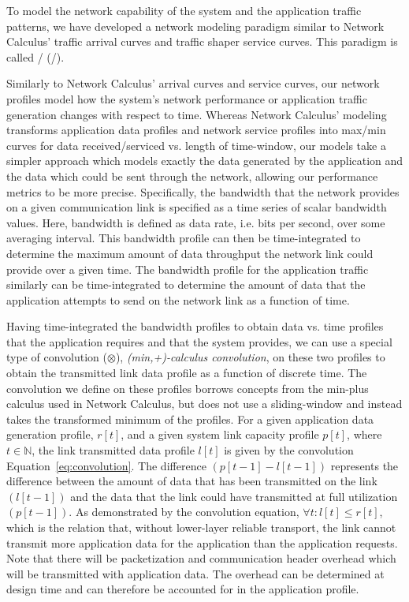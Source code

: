 To model the network capability of the system and the application
traffic patterns, we have developed a network modeling paradigm
similar to Network Calculus' traffic arrival curves and traffic shaper
service curves.  This paradigm is called \fulltool/ (\shorttool/). 

Similarly to Network Calculus' arrival curves and service curves, our
network profiles model how the system's network performance or
application traffic generation changes with respect to time.  Whereas
Network Calculus' modeling transforms application data profiles and
network service profiles into max/min curves for data
received/serviced vs. length of time-window, our models take a simpler
approach which models exactly the data generated by the application
and the data which could be sent through the network, allowing our
performance metrics to be more precise.  Specifically, the bandwidth
that the network provides on a given communication link is specified
as a time series of scalar bandwidth values. Here, bandwidth is
defined as data rate, i.e. bits per second, over some averaging
interval.  This bandwidth profile can then be time-integrated to
determine the maximum amount of data throughput the network link could
provide over a given time.  The bandwidth profile for the application
traffic similarly can be time-integrated to determine the amount of
data that the application attempts to send on the network link as a
function of time.

Having time-integrated the bandwidth profiles to obtain data vs. time
profiles that the application requires and that the system provides,
we can use a special type of convolution ($\otimes$),
\emph{(min,+)-calculus convolution}, on these two profiles to obtain
the transmitted link data profile as a function of discrete time. The
convolution we define on these profiles borrows concepts from the
min-plus calculus used in Network Calculus, but does not use a
sliding-window and instead takes the transformed minimum of the
profiles. For a given application data generation profile, $r[t]$, and
a given system link capacity profile $p[t]$, where $t\in\mathbb{N}$,
the link transmitted data profile $l[t]$ is given by the convolution
Equation~\ref{eq:convolution}. The difference $(p[t-1] - l[t-1])$
represents the difference between the amount of data that has been
transmitted on the link $(l[t-1])$ and the data that the link could
have transmitted at full utilization $(p[t-1])$. As demonstrated by
the convolution equation, $\forall t : l[t] \le r[t]$, which is the
relation that, without lower-layer reliable transport, the link cannot
transmit more application data for the application than the
application requests.  Note that there will be packetization and
communication header overhead which will be transmitted with
application data.  The overhead can be determined at design time and
can therefore be accounted for in the application profile.

